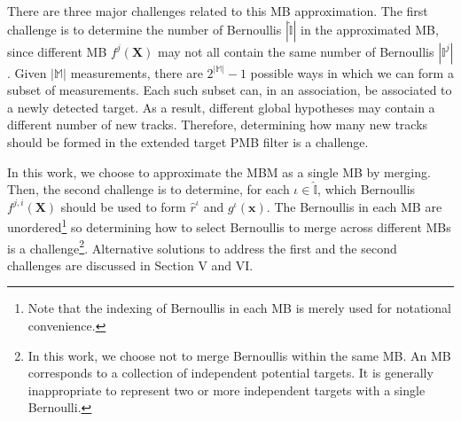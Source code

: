 \documentclass[journal]{IEEEtran}
\begin{document}
\begin{figure}[!t]
    \label{fig:example}
\end{figure}

There are three major challenges related to this MB approximation. The first challenge is to determine the number of Bernoullis $|\hat{\mathbb{I}}|$ in the approximated MB, since different MB $f^j(\mathbf{X})$ may not all contain the same number of Bernoullis $|\mathbb{I}^j|$. Given $|\mathbb{M}|$ measurements, there are $2^{|\mathbb{M}|}-1$ possible ways in which we can form a subset of measurements. Each such subset can, in an association, be associated to a newly detected target. As a result, different global hypotheses may contain a different number of new tracks. Therefore, determining how many new tracks should be formed in the extended target PMB filter is a challenge. 

In this work, we choose to approximate the MBM as a single MB by merging. Then, the second challenge is to determine, for each $\iota \in \hat{\mathbb{I}}$, which Bernoullis $f^{j,i}(\mathbf{X})$ should be used to form $\hat{r}^{\iota}$ and $g^{\iota}(\mathbf{x})$. The Bernoullis in each MB are unordered\footnote{Note that the indexing of Bernoullis in each MB is merely used for notational convenience.} so determining how to select Bernoullis to merge across different MBs is a challenge\footnote{In this work, we choose not to merge Bernoullis within the same MB. An MB corresponds to a collection of independent potential targets. It is generally inappropriate to represent two or more independent targets with a single Bernoulli.}. Alternative solutions to address the first and the second challenges are discussed in Section V and VI.
\end{document}
